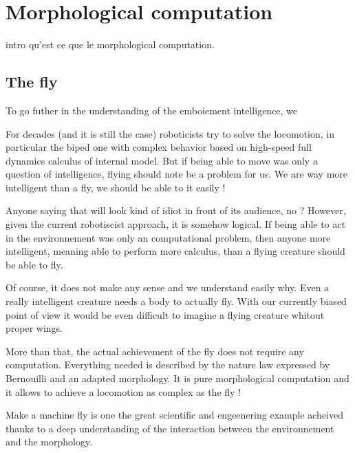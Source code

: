 \section{Morphological computation} %

intro qu'est ce que le morphological computation.


\subsection{The fly} %

To go futher in the understanding of the emboiement intelligence, we

For decades (and it is still the case) roboticists try to solve the locomotion, in particular the biped one with complex behavior based on high-speed full dynamics calculus of internal model. But if being able to move was only a question of intelligence, flying should note be a problem for us. We are way more intelligent than a fly, we should be able to it easily !

Anyone saying that will look kind of idiot in front of its audience, no ? However, given the current robotiscist approach, it is somehow logical. If being able to act in the environnement was only an computational problem, then anyone more intelligent, meaning able to perform more calculus, than a flying creature should be able to fly.

Of course, it does not make any sense and we understand easily why. Even a really intelligent creature needs a body to actually fly. With our currently biased point of view it would be even difficult to imagine a flying creature whitout proper wings.

More than that, the actual achievement of the fly does not require any computation. Everything needed is described by the nature law expressed by Bernouilli and an adapted morphology. It is pure morphological computation and it allows to achieve a locomotion as complex as the fly !



Make a machine fly is one the great scientific and engeenering example acheived thanks to a deep understanding of the interaction between the environnement and the morphology.

